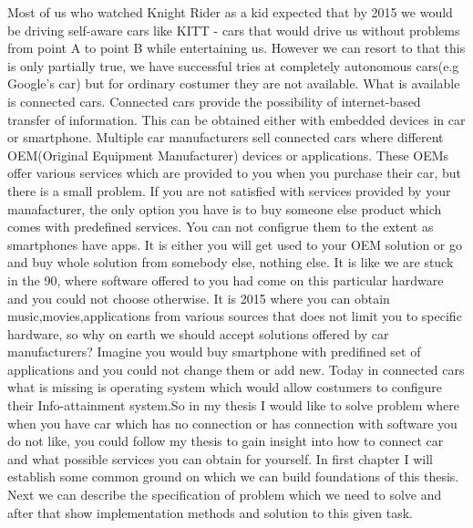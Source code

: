 Most of us who watched Knight Rider as a kid expected that by 2015 we would be driving self-aware cars like KITT - cars that would drive us without problems from point A to point B while entertaining us. However we can resort to that this is only partially true, we have successful tries at completely autonomous cars(e.g Google’s car) but for ordinary costumer they are not available. What is available is connected cars. Connected cars provide the possibility of internet-based transfer of information. This can be obtained either with embedded devices in car or smartphone. Multiple car manufacturers sell connected cars where different OEM(Original Equipment Manufacturer) devices or applications. These OEMs offer various services which are provided to you when you purchase their car, but there is a small problem. If you are not satisfied with services provided by your manafacturer, the only option you have is to buy someone else product which comes with predefined services. You can not configrue them to the extent as smartphones have apps. It is either you will get used to your OEM solution or go and buy whole solution from somebody else, nothing else. It is like we are stuck in the 90, where software offered to you had come on this particular hardware and you could not choose otherwise. It is 2015 where you can obtain music,movies,applications from various sources that does not limit you to specific hardware, so why on earth we should accept solutions offered by car manufacturers? Imagine you would buy smartphone with predifined set of applications and you could not change them or add new. Today in connected cars what is missing is operating system which would allow costumers to configure their Info-attainment system.So in my thesis I would like to solve problem where when you have car which has no connection or has connection with software you do not like, you could follow my thesis to gain insight into how to connect car and what possible services you can obtain for yourself. In first chapter I will establish some common ground on which we can build foundations of this thesis. Next we can describe the specification of problem which we need to solve and after that show implementation methods and solution to this given task.